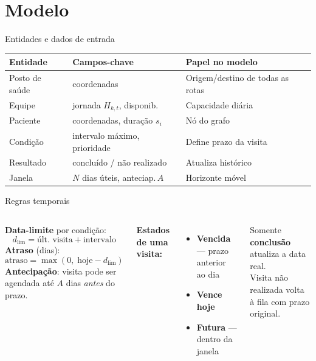 \documentclass[aspectratio=169]{beamer}
\begin{document}
\section{Modelo}

\begin{frame}{Entidades e dados de entrada}
  \centering
  \small
  \begin{tabular}{@{}lll@{}}
    \toprule
    \textbf{Entidade} & \textbf{Campos-chave} & \textbf{Papel no modelo} \\
    \midrule
    Posto de sa\'ude   & coordenadas            & Origem/destino de todas as rotas \\
    Equipe             & jornada $H_{k,t}$, disponib. & Capacidade diária \\
    Paciente           & coordenadas, dura\c{c}\~ao $s_i$ & N\'o do grafo \\
    Condi\c{c}\~ao     & intervalo máximo, prioridade & Define prazo da visita \\
    Resultado          & conclu\'ido / n\~ao realizado & Atualiza hist\'orico \\
    Janela             & $N$ dias \'uteis, anteciap.\,$A$ & Horizonte m\'ovel \\
    \bottomrule
  \end{tabular}
\end{frame}

\begin{frame}{Regras temporais}
  \begin{columns}[T]
      \textbf{Data-limite} por condi\c{c}\~ao:
      \[
        d_{\text{lim}} = \text{\'ult.\ visita} + \text{intervalo}
      \]
      \textbf{Atraso} (dias):
      \[
        \text{atraso} = \max(0,\; \text{hoje} - d_{\text{lim}})
      \]
      \textbf{Antecipa\c{c}\~ao}: visita pode ser agendada at\'e $A$ dias
      \emph{antes} do prazo.

      \textbf{Estados de uma visita:}
      \begin{itemize}
        \item \textcolor{red!70!black}{\textbf{Vencida}} — prazo anterior ao dia
        \item \textcolor{orange!80!black}{\textbf{Vence hoje}}
        \item \textcolor{myblue}{\textbf{Futura}} — dentro da janela
      \end{itemize}
      \vspace{0.4em}
      Somente \textbf{conclus\~ao} atualiza a data real.\\
      Visita n\~ao realizada volta \`a fila com prazo original.
  \end{columns}
\end{frame}
\end{document}
